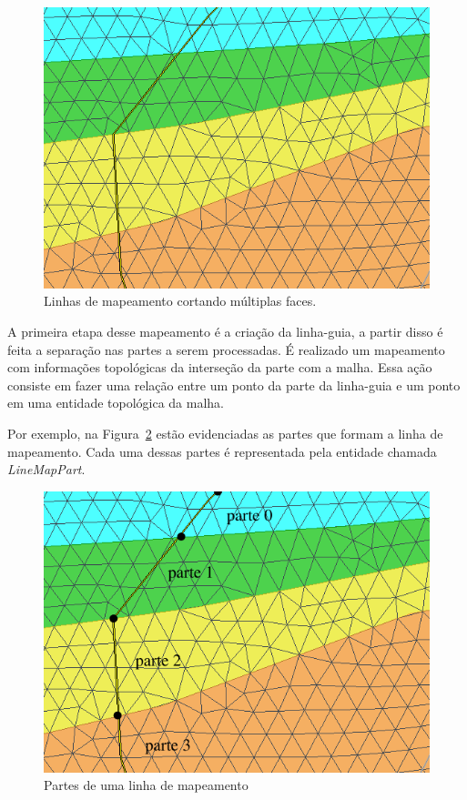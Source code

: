 \begin{figure} [h]
  \begin{center}
    \includegraphics[width=350pt]{images/fig-linhas-de-mapeamento-malhas}
    \caption{Linhas de mapeamento cortando múltiplas faces.}\label{fig-linemap-malhas}
  \end{center}
\end{figure}

A primeira etapa desse mapeamento é a criação da linha-guia, a partir disso é feita a separação nas partes a serem processadas. É realizado um mapeamento com informações topológicas da interseção da parte com a malha. Essa ação consiste em fazer uma relação entre um ponto da parte da linha-guia e um ponto em uma entidade topológica da malha.

Por exemplo, na Figura~\ref{fig-linemap-parts} estão evidenciadas as partes que formam a linha de mapeamento. Cada uma dessas partes é representada pela entidade chamada \textit{LineMapPart}.

\begin{figure} [h]
  \begin{center}
    \includegraphics[width=350pt]{images/fig-lm-parts}
    \caption{Partes de uma linha de mapeamento}\label{fig-linemap-parts}
  \end{center}
\end{figure}

